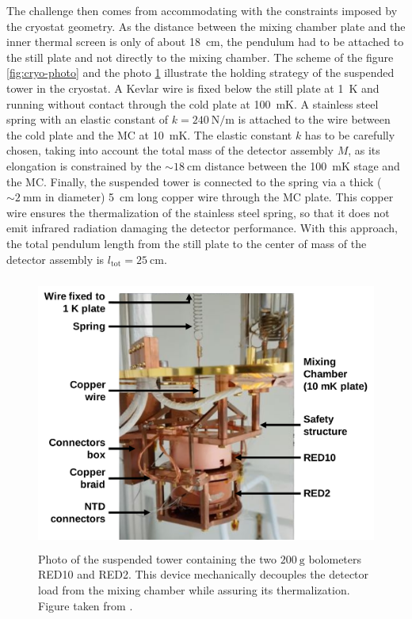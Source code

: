 The challenge then comes from accommodating with the constraints imposed by the cryostat geometry. As the distance between the mixing chamber plate and the inner thermal screen is only of about \SI{18}{\cm}, the pendulum had to be attached to the still plate and not directly to the mixing chamber.
The scheme of the figure \ref{fig:cryo-photo} and the photo \ref{fig:suspended-tower} illustrate the holding strategy of the suspended tower in the cryostat. 
A Kevlar wire is fixed below the still plate at \SI{1}{\kelvin} and running without contact through the cold plate at \SI{100}{\milli\kelvin}. 
A stainless steel spring with an elastic constant of $k=\SI{240}{\newton\per\meter}$ is attached to the wire between the cold plate and the MC at \SI{10}{\milli\kelvin}. The elastic constant $k$ has to be carefully chosen, taking into account the total mass of the detector assembly $M$, as its elongation is constrained by the $\sim \SI{18}{\cm}$ distance between the \SI{100}{\milli\kelvin} stage and the MC. 
Finally, the suspended tower is connected to the spring via a thick ($\sim \SI{2}{\mm}$ in diameter) \SI{5}{\cm} long copper wire through the MC plate. This copper wire ensures the thermalization of the stainless steel spring, so that it does not emit infrared radiation damaging the detector performance.
With this approach, the total pendulum length from the still plate to the center of mass of the detector assembly is $l_{\textrm{tot}} = \SI{25}{\cm}$.


\begin{figure}
\centering
\captionsetup{justification=centering}
\includegraphics[height=9cm]{graphics/damocles.png}
\caption{Photo of the suspended tower containing the two $\SI{200}{\g}$ bolometers RED10 and RED2. This device mechanically decouples the detector load from the mixing chamber while assuring its thermalization. Figure taken from \cite{Maisonobe:2018tbq}.}
\label{fig:suspended-tower} 
\end{figure}


